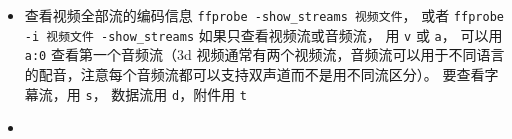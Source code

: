 
\begin{issues}
\issueDraft
\end{issues}

\begin{itemize}
\item 查看视频全部流的编码信息 \verb|ffprobe -show_streams 视频文件|， 或者 \verb|ffprobe -i 视频文件 -show_streams| 如果只查看视频流或音频流， 用 \verb|v| 或 \verb|a|， 可以用 \verb|a:0| 查看第一个音频流（3d 视频通常有两个视频流，音频流可以用于不同语言的配音，注意每个音频流都可以支持双声道而不是用不同流区分）。 要查看字幕流，用 \verb|s|， 数据流用 \verb|d|，附件用 \verb|t|
\item 
\end{itemize}
